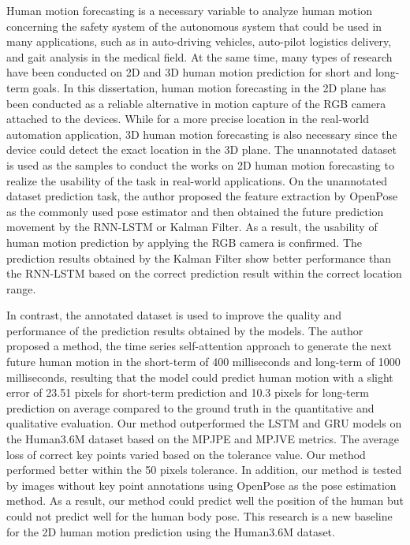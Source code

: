 


\begin{abstracts}        %

Human motion forecasting is a necessary variable to analyze human motion concerning the safety system of the autonomous system that could be used in many applications, such as in auto-driving vehicles, auto-pilot logistics delivery, and gait analysis in the medical field. At the same time, many types of research have been conducted on 2D and 3D human motion prediction for short and long-term goals. In this dissertation, human motion forecasting in the 2D plane has been conducted as a reliable alternative in motion capture of the RGB camera attached to the devices. While for a more precise location in the real-world automation application, 3D human motion forecasting is also necessary since the device could detect the exact location in the 3D plane. The unannotated dataset is used as the samples to conduct the works on 2D human motion forecasting to realize the usability of the task in real-world applications. On the unannotated dataset prediction task, the author proposed the feature extraction by OpenPose as the commonly used pose estimator and then obtained the future prediction movement by the RNN-LSTM or Kalman Filter. As a result, the usability of human motion prediction by applying the RGB camera is confirmed. The prediction results obtained by the Kalman Filter show better performance than the RNN-LSTM based on the correct prediction result within the correct location range.

In contrast, the annotated dataset is used to improve the quality and performance of the prediction results obtained by the models. The author proposed a method, the time series self-attention approach to generate the next future human motion in the short-term of 400 milliseconds and long-term of 1000 milliseconds, resulting that the model could predict human motion with a slight error of 23.51 pixels for short-term prediction and 10.3 pixels for long-term prediction on average compared to the ground truth in the quantitative and qualitative evaluation. Our method outperformed the LSTM and GRU models on the Human3.6M dataset based on the MPJPE and MPJVE metrics. The average loss of correct key points varied based on the tolerance value. Our method performed better within the 50 pixels tolerance. In addition, our method is tested by images without key point annotations using OpenPose as the pose estimation method. As a result, our method could predict well the position of the human but could not predict well for the human body pose. This research is a new baseline for the 2D human motion prediction using the Human3.6M dataset.


\end{abstracts}
